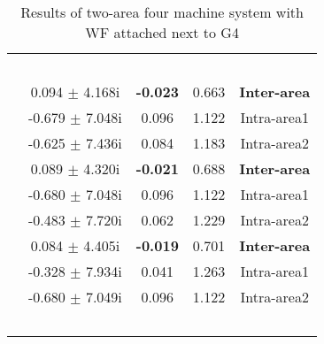 \documentclass[conference,11pt]{IEEEtran}
\begin{document}
\begin{table}[t]
\centering
\caption{Results of two-area four machine system with WF attached next to G4}
\label{tab:table2}
\renewcommand{\arraystretch}{1}
\begin{tabular}{||c|c|c|c|c||}
\hline \hline
\multirow{2}{*}{\parbox{1.1cm}{\\}}  & 
\multirow{2}{*}{\parbox{1.4cm}{}} & 
\multirow{2}{*}{\parbox{1.1cm}{}} & 
\multirow{2}{*}{\parbox{0.8cm}{}} & 
\multirow{2}{*}{\parbox{1.2cm}{}}  \\
{}       &      {}     &         {} &      {}     &       {} \\ \hline
\hline  
\multirow{3}{*}{\centering {10\%WG}}  & 0.094 $\pm$ 4.168i   & \bf{-0.023} & 0.663 & \bf{Inter-area}\\
{}                                          &-0.679 $\pm$ 7.048i   &  0.096 & 1.122 & Intra-area1\\
{}                                          &-0.625 $\pm$ 7.436i   &  0.084 & 1.183 & Intra-area2\\ \hline
\multirow{3}{*}{\centering {25\%WG}}    & 0.089 $\pm$ 4.320i   & \bf{-0.021} & 0.688 & \bf{Inter-area}\\ 
{}                                         &-0.680 $\pm$ 7.048i   &  0.096 & 1.122 & Intra-area1\\ 
{}                                          &-0.483 $\pm$ 7.720i   &  0.062 & 1.229 & Intra-area2\\ \hline
\multirow{3}{*}{\centering {35\%WG}}   & 0.084 $\pm$ 4.405i   & \bf{-0.019} & 0.701 & \bf{Inter-area}\\ 
{}                                          &-0.328 $\pm$ 7.934i   &  0.041 & 1.263 & Intra-area1\\ 
{}                                         &-0.680 $\pm$ 7.049i   &  0.096 & 1.122 & Intra-area2\\ \hline \hline
\multirow{2}{*}{\parbox{1.1cm}{\\}}  & 
\multirow{2}{*}{\parbox{1.4cm}{}} & 
\multirow{2}{*}{\parbox{1.1cm}{}} & 
\multirow{2}{*}{\parbox{0.8cm}{}} & 
\multirow{2}{*}{\parbox{1.2cm}{}}  \\

\end{tabular}
\end{table}
\end{document}
